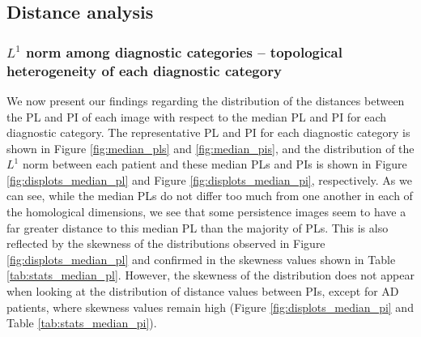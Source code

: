 \documentclass{article}
\begin{document}
\subsection{Distance analysis}

\subsubsection{$L^1$ norm among diagnostic categories -- topological
  heterogeneity of each diagnostic category}\label{sec:results_between_images}

We now present our findings regarding the distribution of the distances between the PL and PI of
each image with respect to the median PL and PI for each diagnostic category. The representative PL
and PI for each diagnostic category is shown in Figure \ref{fig:median_pls} and
\ref{fig:median_pis}, and the distribution of the $L^1$ norm between each patient and these median
PLs and PIs is shown in Figure \ref{fig:displots_median_pl} and Figure \ref{fig:displots_median_pi},
respectively. As we can see, while the median PLs do not differ too much from one another in each of
the homological dimensions, we see that some persistence images seem to have a far greater distance to this
median PL than the majority of PLs. This is also reflected by the skewness of the distributions
observed in Figure \ref{fig:displots_median_pl} and confirmed in the skewness values shown in Table
\ref{tab:stats_median_pl}. However, the skewness of the distribution does not appear when looking at
the distribution of distance values between PIs, except for AD patients, where skewness
values remain high (Figure \ref{fig:displots_median_pi} and Table \ref{tab:stats_median_pi}).
\end{document}
